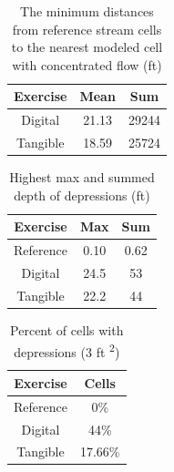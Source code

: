 \documentclass{isprs}
\begin{document}
\begin{table}[h!]
\centering
\begin{tabular}{c c c}
\toprule
Exercise & Mean & Sum\\
\midrule
Digital & 21.13 & 29244\\
Tangible & 18.59 & 25724\\ 
\bottomrule
\end{tabular}
\vspace*{0.5em}
\caption{The minimum distances from reference stream cells to the nearest modeled cell with concentrated flow (ft)} 
\label{table:distance} 
\end{table}

\begin{table}[h!]
\centering
\begin{tabular}{c c c}
\toprule
Exercise & Max & Sum \\
\midrule
Reference & 0.10 & 0.62\\
Digital & 24.5 & 53\\
Tangible & 22.2 & 44\\ 
\bottomrule
\end{tabular}
\vspace*{0.5em}
\caption{Highest max and summed depth of depressions (ft)}
\label{table:depressions} 
\end{table}

\begin{table}[h!]
\centering
\begin{tabular}{c c}
\toprule
Exercise & Cells\\
\midrule
Reference & 0\%\\
Digital & 44\%\\
Tangible & 17.66\%\\ 
\bottomrule
\end{tabular}
\vspace*{0.5em}
\caption{Percent of cells with depressions (3 ft \textsuperscript{2})} 
\label{table:cells} 
\end{table}

\end{document}
